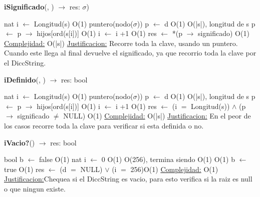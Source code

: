 \begin{Representacion}
\begin{Algoritmos}
\begin{algorithm}[H]{\textbf{iSignificado}(, ) $\to$ res: $\sigma$)}
	\begin{algorithmic}[1]
		\State nat i $\gets$ Longitud(s) \Comment O(1)
		\State puntero(nodo($\sigma$)) p $\gets$ d \Comment O(1)
		 \Comment O(|s|), longitud de s
			\State p $\gets$ p $\to$ hijos[ord(s[i])] \Comment O(1)
		 	\State i $\gets$ i +1 \Comment O(1)
		 \EndWhile
		 \State res $\gets$ *(p $\to$ significado) \Comment O(1)
		\medskip
		\Statex \underline{Complejidad:} O(|s|)
			\Statex \underline{Justificacion:} Recorre toda la clave, usando un puntero. Cuando este llega al final devuelve el significado, ya que recorrio toda la clave por el DiccString.  
	\end{algorithmic}
\end{algorithm}

\begin{algorithm}[H]{\textbf{iDefinido}(, ) $\to$ res: bool}
	\begin{algorithmic}[1]
		\State nat i $\gets$ Longitud(s) \Comment O(1)
		\State puntero(nodo($\sigma$)) p $\gets$ d \Comment O(1)
		 \Comment O(|s|), longitud de s
			\State p $\gets$ p $\to$ hijos[ord(s[i])] \Comment O(1)
		 	\State i $\gets$ i +1 \Comment O(1)
		 \EndWhile
		 \State res $\gets$ (i $=$ Longitud(s)) $\wedge$ (p$\to$ significado $\neq$ NULL) \Comment O(1)
		\medskip
		\Statex \underline{Complejidad:} O(|s|)
			\Statex \underline{Justificacion:} En el peor de los casos recorre toda la clave para verificar si esta definida o no.  
	\end{algorithmic}
\end{algorithm}

\begin{algorithm}[H]{\textbf{iVacio?}() $\to$ res: bool}
	\begin{algorithmic}[1]
		\State bool b $\gets$ false \Comment O(1)
		\State nat i $\gets$ 0 \Comment O(1)
		 \Comment O(256), termina siendo O(1)
			 \Comment O(1)
				 b $\gets$ true \Comment O(1)
			\EndIf
		\EndWhile
		\State res $\gets$ (d $=$ NULL) $\vee$ (i $=$ 256)\Comment O(1)
		\medskip
		\Statex \underline{Complejidad:} O(1)
			\Statex \underline{Justificacion:}Chequea si el DiccString es vacio, para esto verifica si la raiz es null o que ningun existe.
	\end{algorithmic}
\end{algorithm}


\end{Algoritmos}
\end{Representacion}
